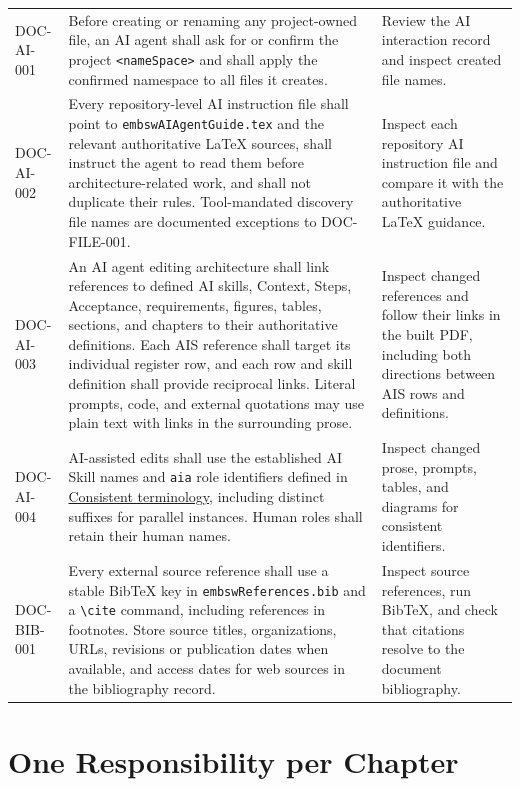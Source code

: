 \begin{tabularx}{\linewidth}{L{2.5cm}Y L{3.0cm}}
DOC-AI-001 & Before creating or renaming any project-owned file, an AI agent
shall ask for or confirm the project \texttt{\textless nameSpace\textgreater}
and shall apply the confirmed namespace to all files it creates. & Review the
AI interaction record and inspect created file names.\\
DOC-AI-002 & Every repository-level AI instruction file shall point to
\texttt{embswAIAgentGuide.tex} and the relevant authoritative LaTeX sources,
shall instruct the agent to read them before architecture-related work, and
shall not duplicate their rules. Tool-mandated discovery file names are
documented exceptions to DOC-FILE-001. & Inspect each repository AI instruction
file and compare it with the authoritative LaTeX guidance.\\
\label{Requirement:DOCAI003}DOC-AI-003 & An AI agent editing
architecture shall link references to defined AI skills, Context, Steps,
Acceptance, requirements, figures, tables, sections, and chapters to their
authoritative definitions. Each AIS reference shall target its individual
register row, and each row and skill definition shall provide reciprocal links.
Literal prompts, code, and external quotations may use plain text with links
in the surrounding prose. & Inspect changed references and follow their links
in the built PDF, including both directions between AIS rows and definitions.\\
\label{Requirement:DOCAI004}DOC-AI-004 & AI-assisted edits shall use the established AI Skill names and \texttt{aia} role identifiers defined in \hyperref[Rule:AITerminologyConsistency]{Consistent terminology}, including distinct suffixes for parallel instances. Human roles shall retain their human names. & Inspect changed prose, prompts, tables, and diagrams for consistent identifiers.\\
\label{Requirement:DOCBIB001}DOC-BIB-001 & Every external source reference shall use a stable BibTeX key in \texttt{embswReferences.bib} and a \texttt{\textbackslash cite} command, including references in footnotes. Store source titles, organizations, URLs, revisions or publication dates when available, and access dates for web sources in the bibliography record. & Inspect source references, run BibTeX, and check that citations resolve to the document bibliography.\\
\end{tabularx}
\normalsize

\section{One Responsibility per Chapter}
\label{Section:ChapterResponsibilityConvention}


